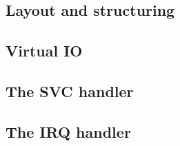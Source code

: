 \subsection{Layout and structuring}
\subsection{Virtual IO}
\subsection{The SVC handler}
\subsection{The IRQ handler}
